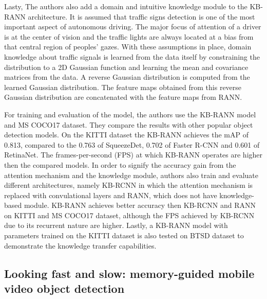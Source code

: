 \documentclass[conference]{IEEEtran}
\begin{document}
Lasty, The authors also add a domain and intuitive knowledge module to the KB-RANN architecture. It is assumed that traffic signs detection is one of the most important aspect of autonomous driving. The major focus of attention of a driver is at the center of vision and the traffic lights are always located at a bias from that central region of peoples' gazes. With these assumptions in place, domain knowledge about traffic signals is learned from the data itself by constraining the distribution to a 2D Gaussian function and learning the mean and covariance matrices from the data. A reverse Gaussian distribution is computed from the learned Gaussian distribution. The feature maps obtained from this reverse Gaussian distribution are concatenated with the feature maps from RANN. \newline

For training and evaluation of the model, the authors use the KB-RANN model and MS COCO17 dataset. They compare the results with other popular object detection models. On the KITTI dataset the KB-RANN achieves the mAP of 0.813, compared to the 0.763 of SqueezeDet, 0.702 of Faster R-CNN and 0.601 of RetinaNet. The frames-per-second (FPS) at which KB-RANN operates are higher then the compared models. In order to signify the accuracy gain from the attention mechanism and the knowledge module, authors also train and evaluate different architectures, namely KB-RCNN in which the attention mechanism is replaced with convulational layers and RANN, which does not have knowledge-based module. KB-RANN achieves better accuracy then KB-RCNN and RANN on KITTI and MS COCO17 dataset, although the FPS achieved by KB-RCNN due to its recurrent nature are higher. Lastly, a KB-RANN model with parameters trained on the KITTI dataset is also tested on BTSD dataset to demonstrate the knowledge transfer capabilities.

\subsection{Looking fast and slow: memory-guided mobile video object detection \cite{b7}}
\end{document}
